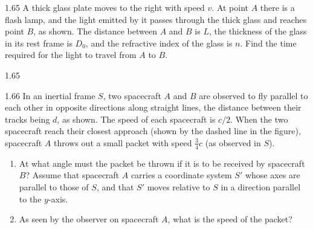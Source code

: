 \begin{problem}{1.65}
A thick glass plate moves to the right with speed $v$. At point $A$ there is a flash lamp, and the light emitted by it passes through the thick glass and reaches point $B$, as shown. The distance between $A$ and $B$ is $L$, the thickness of the glass in its rest frame is $D_0$, and the refractive index of the glass is $n$. Find the time required for the light to travel from $A$ to $B$.
\end{problem}

\begin{figbox}{1.65}
\end{figbox}

\begin{problem}{1.66}
In an inertial frame $S$, two spacecraft $A$ and $B$ are observed to fly parallel to each other in opposite directions along straight lines, the distance between their tracks being $d$, as shown. The speed of each spacecraft is $c/2$. When the two spacecraft reach their closest approach (shown by the dashed line in the figure), spacecraft $A$ throws out a small packet with speed $\frac{3}{4}c$ (as observed in $S$).
\begin{enumerate}[label=(\arabic*),leftmargin=2.2em,itemsep=1pt,topsep=2pt]
\item At what angle must the packet be thrown if it is to be received by spacecraft $B$? Assume that spacecraft $A$ carries a coordinate system $S'$ whose axes are parallel to those of $S$, and that $S'$ moves relative to $S$ in a direction parallel to the $y$-axis.
\item As seen by the observer on spacecraft $A$, what is the speed of the packet?
\end{enumerate}
\end{problem}

